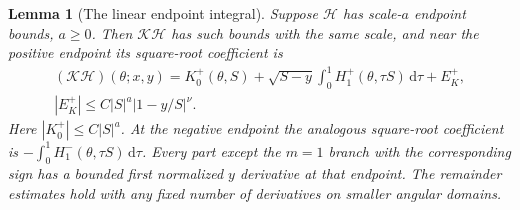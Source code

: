 \documentclass[a4paper,10pt]{article}
\numberwithin{equation}{section}
\newcommand{\dd}{\mathrm{d}}
\theoremstyle{paperplain}
\newtheorem{lmm}[thm]{Lemma}
\theoremstyle{paperremark}
\theoremstyle{paperplain}
\begin{document}
\begin{lmm}[The linear endpoint integral]\label{lmm:b:linear-endpoint}
Suppose $\mathcal H$ has scale-$a$ endpoint bounds, $a\geq0$.
Then $\mathcal K\mathcal H$ has such bounds with the same scale,
and near the positive endpoint its square-root coefficient is
\begin{equation}\label{eq:b:linear-endpoint}
 \begin{aligned}
 (\mathcal K\mathcal H)(\theta;x,y)
 =K_0^+(\theta,S)
   +\sqrt{S-y}\int_0^1H_1^+(\theta,\tau S)\,\dd\tau+E_K^+,\\
 |E_K^+|\leq C|S|^a|1-y/S|^\nu.
 \end{aligned}
\end{equation}
Here $|K_0^+|\leq C|S|^a$. At the negative endpoint the analogous
square-root coefficient is
$-\int_0^1H_1^-(\theta,\tau S)\,\dd\tau$.
Every part except the $m=1$ branch with the corresponding sign
has a bounded first normalized $y$ derivative at that endpoint.
The remainder estimates hold with any fixed number of derivatives
on smaller angular domains.
\end{lmm}
\end{document}
